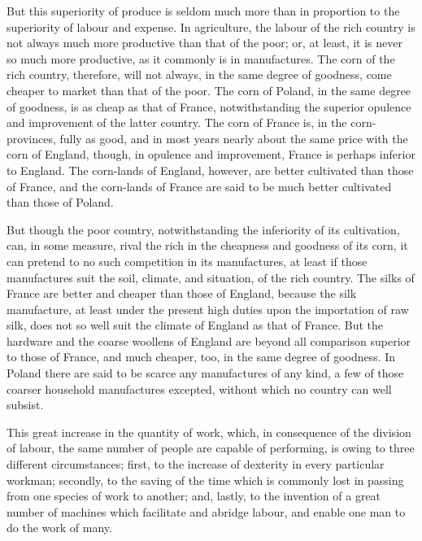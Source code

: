 But this superiority of produce is seldom much more than in proportion to the superiority of labour and expense. In agriculture, the labour of the rich country is not always much more productive than that of the poor; or, at least, it is never so much more productive, as it commonly is in manufactures. The corn of the rich country, therefore, will not always, in the same degree of goodness, come cheaper to market than that of the poor. The corn of Poland, in the same degree of goodness, is as cheap as that of France, notwithstanding the superior opulence and improvement of the latter country. The corn of France is, in the corn-provinces, fully as good, and in most years nearly about the same price with the corn of England, though, in opulence and improvement, France is perhaps inferior to England. The corn-lands of England, however, are better cultivated than those of France, and the corn-lands of France are said to be much better cultivated than those of Poland.\par

But though the poor country, notwithstanding the inferiority of its cultivation, can, in some measure, rival the rich in the cheapness and goodness of its corn, it can pretend to no such competition in its manufactures, at least if those manufactures suit the soil, climate, and situation, of the rich country. The silks of France are better and cheaper than those of England, because the silk manufacture, at least under the present high duties upon the importation of raw silk, does not so well suit the climate of England as that of France. But the hardware and the coarse woollens of England are beyond all comparison superior to those of France, and much cheaper, too, in the same degree of goodness. In Poland there are said to be scarce any manufactures of any kind, a few of those coarser household manufactures excepted, without which no country can well subsist.\par

This great increase in the quantity of work, which, in consequence of the division of labour, the same number of people are capable of performing, is owing to three different circumstances; first, to the increase of dexterity in every particular workman; secondly, to the saving of the time which is commonly lost in passing from one species of work to another; and, lastly, to the invention of a great number of machines which facilitate and abridge labour, and enable one man to do the work of many.\par

